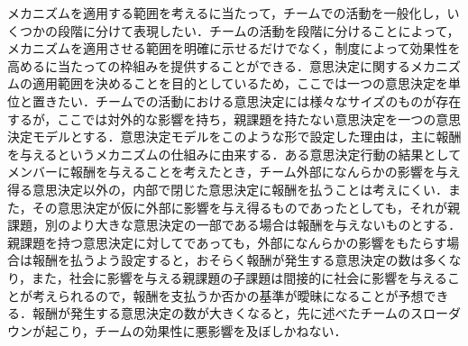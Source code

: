 \documentclass[a4paper, 11pt]{jsarticle}
\begin{document}
メカニズムを適用する範囲を考えるに当たって，チームでの活動を一般化し，いくつかの段階に分けて表現したい．チームの活動を段階に分けることによって，メカニズムを適用させる範囲を明確に示せるだけでなく，制度によって効果性を高めるに当たっての枠組みを提供することができる．意思決定に関するメカニズムの適用範囲を決めることを目的としているため，ここでは一つの意思決定を単位と置きたい．チームでの活動における意思決定には様々なサイズのものが存在するが，ここでは対外的な影響を持ち，親課題を持たない意思決定を一つの意思決定モデルとする．意思決定モデルをこのような形で設定した理由は，主に報酬を与えるというメカニズムの仕組みに由来する．ある意思決定行動の結果としてメンバーに報酬を与えることを考えたとき，チーム外部になんらかの影響を与え得る意思決定以外の，内部で閉じた意思決定に報酬を払うことは考えにくい．また，その意思決定が仮に外部に影響を与え得るものであったとしても，それが親課題，別のより大きな意思決定の一部である場合は報酬を与えないものとする．親課題を持つ意思決定に対してであっても，外部になんらかの影響をもたらす場合は報酬を払うよう設定すると，おそらく報酬が発生する意思決定の数は多くなり，また，社会に影響を与える親課題の子課題は間接的に社会に影響を与えることが考えられるので，報酬を支払うか否かの基準が曖昧になることが予想できる．報酬が発生する意思決定の数が大きくなると，先に述べたチームのスローダウンが起こり，チームの効果性に悪影響を及ぼしかねない．
\end{document}

